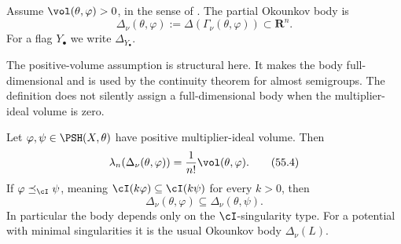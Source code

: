 \begin{definition}
\label{def:ok-algebraic-partial-body}
Assume $\vol(\theta,\varphi)>0$, in the sense of
.
The partial Okounkov body is
\[
 \Delta_\nu(\theta,\varphi)
       :=\Delta\!\left(\Gamma_\nu(\theta,\varphi)\right)
       \subset\mathbf R^n.
\tag{55.3}\label{eq:ok-partial-body}
\]
For a flag $Y_\bullet$ we write $\Delta_{Y_\bullet}$.
\end{definition}

The positive-volume assumption is structural here.
It makes the body full-dimensional and is used by the continuity theorem
for almost semigroups.
The definition does not silently assign a full-dimensional body when the
multiplier-ideal volume is zero.

\begin{theorem}\label{thm:ok-algebraic-volume-order}
Let $\varphi,\psi\in\PSH(X,\theta)$ have positive multiplier-ideal
volume.
Then
\[
 \lambda_n\!\left(\Delta_\nu(\theta,\varphi)\right)
     =\frac1{n!}\vol(\theta,\varphi).
\tag{55.4}\label{eq:ok-algebraic-volume}
\]
If
$\varphi\preceq_{\cI}\psi$, meaning
$\cI(k\varphi)\subseteq\cI(k\psi)$ for every $k>0$, then
\[
 \Delta_\nu(\theta,\varphi)
       \subseteq\Delta_\nu(\theta,\psi).
\tag{55.5}\label{eq:ok-i-order}
\]
In particular the body depends only on the $\cI$-singularity type.
For a potential with minimal singularities it is the usual Okounkov body
$\Delta_\nu(L)$.
\end{theorem}

